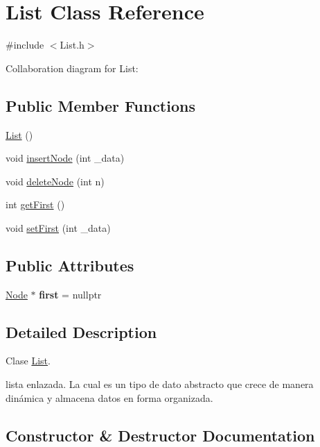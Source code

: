 \hypertarget{classList}{}\section{List Class Reference}
\label{classList}


{\ttfamily \#include $<$List.\+h$>$}



Collaboration diagram for List\+:
\subsection*{Public Member Functions}
\begin{DoxyCompactItemize}
\item 
\hyperlink{classList_a64d878a92d11f7c63c70cbe4e7dd4176}{List} ()
\item 
void \hyperlink{classList_ab85bbd9b130eec1bc1c7139f5458ecfb}{insert\+Node} (int \+\_\+data)
\item 
void \hyperlink{classList_a6531aac590fce9b8e5040bcb633c89b1}{delete\+Node} (int n)
\item 
int \hyperlink{classList_a0856adc8bce70d697a8c650b505d6080}{get\+First} ()
\item 
void \hyperlink{classList_ab5414be89ca36fe1a705e0a65cc3f1e8}{set\+First} (int \+\_\+data)
\end{DoxyCompactItemize}
\subsection*{Public Attributes}
\begin{DoxyCompactItemize}
\item 
\mbox{\label{classList_abffef6e25dd87e04d83044aa63b2bf30}} 
\hyperlink{classNode}{Node} $\ast$ {\bfseries first} = nullptr
\end{DoxyCompactItemize}


\subsection{Detailed Description}
Clase \hyperlink{classList}{List}.

lista enlazada. La cual es un tipo de dato abstracto que crece de manera dinámica y almacena datos en forma organizada. 

\subsection{Constructor \& Destructor Documentation}
\mbox{\label{classList_a64d878a92d11f7c63c70cbe4e7dd4176}} 
